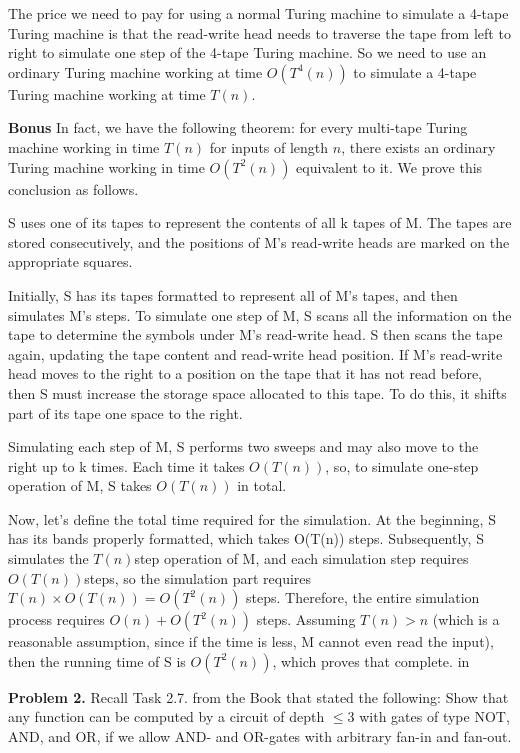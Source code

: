 \documentclass[11pt]{article}
\begin{document}
The price we need to pay for using a normal Turing machine to simulate a 4-tape Turing machine is that the read-write head needs to traverse the tape from left to right to simulate one step of the 4-tape Turing machine. So we need to use an ordinary Turing machine working at time $O(T^4(n))$ to simulate a 4-tape Turing machine working at time $T(n)$.

\textbf{Bonus} In fact, we have the following theorem: for every multi-tape Turing machine working in time $T(n)$ for inputs of length $n$, there exists an ordinary Turing machine working in time $O(T^2(n))$ equivalent to it. We prove this conclusion as follows.

S uses one of its tapes to represent the contents of all k tapes of M. The tapes are stored consecutively, and the positions of M's read-write heads are marked on the appropriate squares.

Initially, S has its tapes formatted to represent all of M's tapes, and then simulates M's steps. To simulate one step of M, S scans all the information on the tape to determine the symbols under M's read-write head. S then scans the tape again, updating the tape content and read-write head position. If M's read-write head moves to the right to a position on the tape that it has not read before, then S must increase the storage space allocated to this tape. To do this, it shifts part of its tape one space to the right.

Simulating each step of M, S performs two sweeps and may also move to the right up to k times. Each time it takes $O(T(n))$, so, to simulate one-step operation of M, S takes $O(T(n))$ in total.

Now, let's define the total time required for the simulation. At the beginning, S has its bands properly formatted, which takes O(T(n)) steps. Subsequently, S simulates the $T(n)$step operation of M, and each simulation step requires $O(T(n))$steps, so the simulation part requires $T(n)\times O(T(n))= O(T^2(n))$ steps. Therefore, the entire simulation process requires $O(n)+O(T^2(n))$ steps. Assuming $T(n)>n$ (which is a reasonable assumption, since if the time is less, M cannot even read the input), then the running time of S is $O(T^2(n))$, which proves that complete.
 in

{\bf Problem 2.} Recall Task 2.7. from the Book that stated the following: Show that any function can be computed by a circuit of depth $\leq3$ with gates of type NOT, AND, and OR, if we allow AND- and OR-gates with arbitrary fan-in and fan-out.
\end{document}
